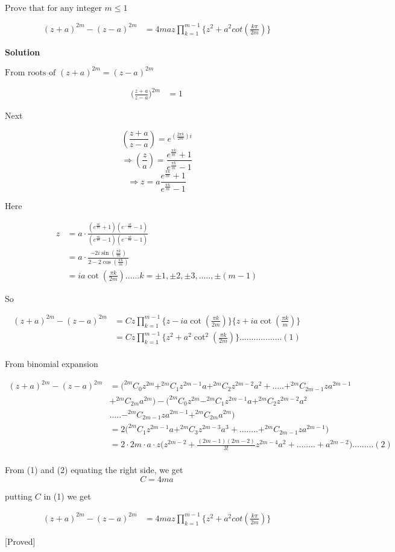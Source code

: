 \documentclass[fleqn]{article}
\begin{document}
$\text{Prove that for any integer }m \leq 1$

\begin{align*}
(z+a)^{2m}-(z-a)^{2m} &= 4maz\prod_{k=1}^{m-1}\{z^{2}+a^{2}cot{(\frac{k\pi}{2m})}\}
\end{align*}

\textbf{Solution}

\vspace{12pt}
$\text{From roots of }(z+a)^{2m} = (z-a)^{2m}$

\begin{align*}
\bigg(\frac{z+a}{z-a}\bigg)^{2m} &= 1
\end{align*}

Next

$$(\frac{z+a}{z-a}) = e^{(\frac{2\pi k}{2m})i}$$
$$\Rightarrow(\frac{z}{a})=\frac{e^{\frac{\pi k}{m}}+1}{e^{\frac{\pi k}{m}}-1}$$
$$\Rightarrow z = a\frac{e^{\frac{\pi k}{m}}+1}{e^{\frac{\pi k}{m}}-1}$$

Here

\begin{align*}
z &= a\cdot \frac{(e^{\frac{\pi k}{m}}+1)(e^{-\frac{\pi k}{m}}-1)}{(e^{\frac{\pi k}{m}}-1)(e^{-\frac{\pi k}{m}}-1)}\\
&=a \cdot \frac{-2i\sin(\frac{\pi k}{m})}{2-2\cos(\frac{\pi k}{m})}\\
&=ia\cot(\frac{\pi k}{2m})......k=\pm1,\pm2,\pm3,.....,\pm(m-1)
\end{align*}

So

\begin{align*}
(z+a)^{2m}-(z-a)^{2m} &= Cz\prod_{k=1}^{m-1}\{z-ia\cot(\frac{\pi k}{2m})\}\{z+ia\cot(\frac{\pi k}{m})\}\\
				&=Cz\prod_{k=1}^{m-1}\{z^{2}+a^{2}\cot^{2}(\frac{\pi k}{2m})\}..................(1)\\				
\end{align*}

From binomial expansion

\begin{align*}
(z+a)^{2m}-(z-a)^{2m} &= (^{2m}C_{0}z^{2m}+^{2m}C_{1}z^{2m-1}a+^{2m}C_{2}z^{2m-2}a^{2}+.....+^{2m}C_{2m-1}za^{2m-1}\\
&+^{2m}C_{2m}a^{2m}) - (^{2m}C_{0}z^{2m}-^{2m}C_{1}z^{2m-1}a+^{2m}C_{2}z^{2m-2}a^{2}\\
&.....-^{2m}C_{2m-1}za^{2m-1}+^{2m}C_{2m}a^{2m})\\
&=2\bigg(^{2m}C_{1}z^{2m-1}a+^{2m}C_{3}z^{2m-3}a^{3}+........+^{2m}C_{2m-1}za^{2m-1}\bigg)\\
&=2\cdot 2m\cdot a\cdot z\bigg(z^{2m-2}+\frac{(2m-1)(2m-2)}{3!}z^{2m-4}a^{2}+........+a^{2m-2}\bigg).........(2)\\
\end{align*}

From (1) and  (2) equating the right side, we get
$$C= 4ma$$

putting $C$ in (1) we get 

\begin{align*}
(z+a)^{2m}-(z-a)^{2m} &= 4maz\prod_{k=1}^{m-1}\{z^{2}+a^{2}cot{(\frac{k\pi}{2m})}\}
\end{align*}

\begin{center}
[Proved]
\end{center}
\end{document}
